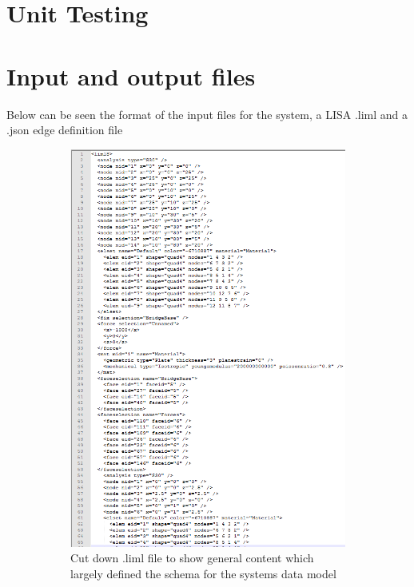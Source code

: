 \section{Unit Testing}



\cite{Centripetal}

\section{Input and output files}
Below can be seen the format of the input files for the system, a LISA .liml and a .json edge definition file\\

\begin{figure}[h!!]
\centering
\begin{subfigure}{.5\textwidth}
  \centering
  \includegraphics[width=0.6\linewidth]{../Graphics/limlFileLayout.png}
  \caption{Cut down .liml file to show general content which largely defined the schema for the systems data model}
  \label{fig:sub1}
\end{subfigure}%
\begin{subfigure}{.5\textwidth}
  \centering

\end{subfigure}
\end{figure}
